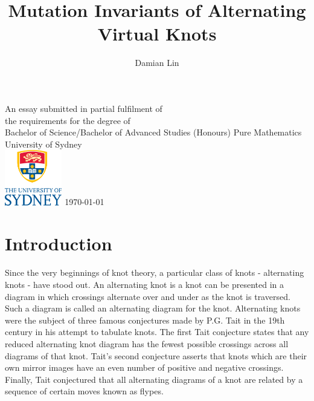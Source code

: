 \documentclass[12pt]{report}
\theoremstyle{upright}
\begin{document}
	

\author{Damian Lin}
\title{Mutation Invariants of Alternating Virtual Knots}

\cleardoublepage \thispagestyle{empty}
\null \vfil
\begingroup
\LARGE \bfseries \centering
\openup \medskipamount
\thetitle \par \vspace{30pt}
\centering \mdseries \theauthor \par \bigskip
\endgroup
\vfil \vfil \vfil
\begin{center}
	An essay submitted in partial fulfilment of\\
	the requirements for the degree of\\
	Bachelor of Science/Bachelor of Advanced Studies (Honours)
	\vfil\vfil
	{\large Pure Mathematics\\[5pt]
		University of Sydney}\\
	\vskip6mm
	\includegraphics[width=25mm]{graphics/USY_MB1_CMYK_Stacked_Logo}
	\vfil
	\normalsize\today
\end{center}
\vfil
\cleardoublepage

\tableofcontents

\chapter*{Introduction}

Since the very beginnings of knot theory, a particular class of knots - alternating knots - have stood out. An alternating knot is a knot can be presented in a diagram in which crossings alternate over and under as the knot is traversed. Such a diagram is called an alternating diagram for the knot. Alternating knots were the subject of three famous conjectures made by P.G. Tait in the 19th century in his attempt to tabulate knots. The first Tait conjecture states that any reduced alternating knot diagram has the fewest possible crossings across all diagrams of that knot. Tait's second conjecture asserts that knots which are their own mirror images have an even number of positive and negative crossings. Finally, Tait conjectured that all alternating diagrams of a knot are related by a sequence of certain moves known as flypes.
\end{document}

